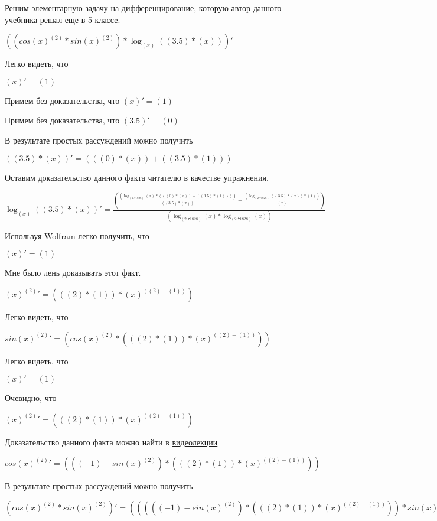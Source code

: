 \documentclass[12pt,a4paper,fleqn]{article}
\theoremstyle{definition}
\begin{document}
Решим элементарную задачу на дифференцирование, которую автор данного учебника решал еще в 5 классе.


$((cos{( x )}^{( 2 )} * sin{( x )}^{( 2 )}) * \log_{( x )}{(( 3.5 ) * ( x ))})'$

Легко видеть, что

$( x )' = ( 1 )$

Примем без доказательства, что
$( x )' = ( 1 )$

Примем без доказательства, что
$( 3.5 )' = ( 0 )$

В результате простых рассуждений можно получить

$(( 3.5 ) * ( x ))' = ((( 0 ) * ( x )) + (( 3.5 ) * ( 1 )))$

Оставим доказательство данного факта читателю в качестве упражнения.

$\log_{( x )}{(( 3.5 ) * ( x ))}' = \frac{(\frac{(\log_{( 2.71828 )}{( x )} * ((( 0 ) * ( x )) + (( 3.5 ) * ( 1 ))))}{(( 3.5 ) * ( x ))}
 - \frac{(\log_{( 2.71828 )}{(( 3.5 ) * ( x ))} * ( 1 ))}{( x )}
)}{(\log_{( 2.71828 )}{( x )} * \log_{( 2.71828 )}{( x )})}
$

Используя Wolfram легко получить, что

$( x )' = ( 1 )$

Мне было лень доказывать этот факт.

${( x )}^{( 2 )}' = ((( 2 ) * ( 1 )) * {( x )}^{(( 2 ) - ( 1 ))})$

Легко видеть, что

$sin{( x )}^{( 2 )}' = (cos{( x )}^{( 2 )} * ((( 2 ) * ( 1 )) * {( x )}^{(( 2 ) - ( 1 ))}))$

Легко видеть, что

$( x )' = ( 1 )$

Очевидно, что

${( x )}^{( 2 )}' = ((( 2 ) * ( 1 )) * {( x )}^{(( 2 ) - ( 1 ))})$

Доказательство данного факта можно найти в \href{https://www.youtube.com/watch?v=dQw4w9WgXcQ}{видеолекции}

$cos{( x )}^{( 2 )}' = ((( -1 ) - sin{( x )}^{( 2 )}) * ((( 2 ) * ( 1 )) * {( x )}^{(( 2 ) - ( 1 ))}))$

В результате простых рассуждений можно получить

$(cos{( x )}^{( 2 )} * sin{( x )}^{( 2 )})' = ((((( -1 ) - sin{( x )}^{( 2 )}) * ((( 2 ) * ( 1 )) * {( x )}^{(( 2 ) - ( 1 ))})) * sin{( x )}^{( 2 )}) + (cos{( x )}^{( 2 )} * (cos{( x )}^{( 2 )} * ((( 2 ) * ( 1 )) * {( x )}^{(( 2 ) - ( 1 ))}))))$
\end{document}
